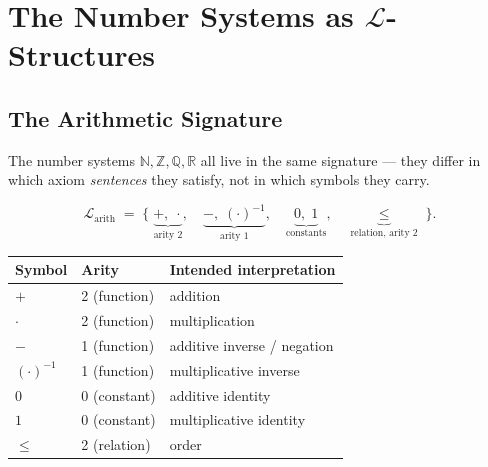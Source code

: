 %

\section{The Number Systems as $\mathcal{L}$-Structures}
\label{sec:number-systems-as-structures}

\subsection{The Arithmetic Signature}

The number systems $\mathbb{N}, \mathbb{Z}, \mathbb{Q}, \mathbb{R}$
all live in the same signature — they differ in which axiom
\emph{sentences} they satisfy, not in which symbols they carry.

\begin{tcolorbox}[colback=axiombox, colframe=axiomborder, arc=2pt,
  left=6pt, right=6pt, top=4pt, bottom=4pt,
  title={\small\textbf{The Arithmetic Signature $\mathcal{L}_{\mathrm{arith}}$}},
  fonttitle=\small\bfseries]

\[
\mathcal{L}_{\mathrm{arith}}
\;=\;
\bigl\{\;
  \underbrace{+,\;\cdot}_{\text{arity 2}},\quad
  \underbrace{-,\;(\cdot)^{-1}}_{\text{arity 1}},\quad
  \underbrace{0,\;1}_{\text{constants}},\quad
  \underbrace{{\leq}}_{\text{relation, arity 2}}
\;\bigr\}.
\]

\medskip
\begin{tabular}{@{} l l l @{}}
\toprule
\textbf{Symbol} & \textbf{Arity} & \textbf{Intended interpretation} \\
\midrule
$+$        & 2 (function) & addition \\
$\cdot$    & 2 (function) & multiplication \\
$-$        & 1 (function) & additive inverse / negation \\
$(\cdot)^{-1}$ & 1 (function) & multiplicative inverse \\
$0$        & 0 (constant) & additive identity \\
$1$        & 0 (constant) & multiplicative identity \\
${\leq}$   & 2 (relation) & order \\
\bottomrule
\end{tabular}
\end{tcolorbox}

